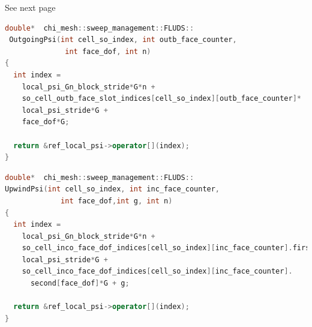 \documentclass[11pt,letterpaper,titlepage]{article}
\numberwithin{equation}{section}
\begin{document}
\vspace{2cm}
See next page

\newpage
\begin{lstlisting}[language=c++]
double*  chi_mesh::sweep_management::FLUDS::
 OutgoingPsi(int cell_so_index, int outb_face_counter,
              int face_dof, int n)
{
  int index =
    local_psi_Gn_block_stride*G*n +
    so_cell_outb_face_slot_indices[cell_so_index][outb_face_counter]*
    local_psi_stride*G +
    face_dof*G;

  return &ref_local_psi->operator[](index);
}
\end{lstlisting}

\begin{lstlisting}[language=c++]
double*  chi_mesh::sweep_management::FLUDS::
UpwindPsi(int cell_so_index, int inc_face_counter,
             int face_dof,int g, int n)
{
  int index =
    local_psi_Gn_block_stride*G*n +
    so_cell_inco_face_dof_indices[cell_so_index][inc_face_counter].first*
    local_psi_stride*G +
    so_cell_inco_face_dof_indices[cell_so_index][inc_face_counter].
      second[face_dof]*G + g;

  return &ref_local_psi->operator[](index);
}
\end{lstlisting}
\end{document}
